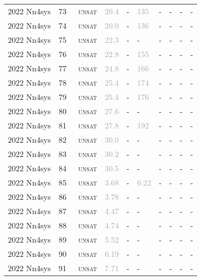 \begin{center}
{\begin{longtable}{@{}llllllllll@{}}
2022 Nn4sys & 73 & ~\textsc{unsat} & \textcolor{darkgray}{20.4} & - & \textcolor{darkgray}{135} & - & - & - & - \\
2022 Nn4sys & 74 & ~\textsc{unsat} & \textcolor{darkgray}{20.0} & - & \textcolor{darkgray}{136} & - & - & - & - \\
2022 Nn4sys & 75 & ~\textsc{unsat} & \textcolor{darkgray}{22.3} & - & - & - & - & - & - \\
2022 Nn4sys & 76 & ~\textsc{unsat} & \textcolor{darkgray}{22.8} & - & \textcolor{darkgray}{155} & - & - & - & - \\
2022 Nn4sys & 77 & ~\textsc{unsat} & \textcolor{darkgray}{24.8} & - & \textcolor{darkgray}{166} & - & - & - & - \\
2022 Nn4sys & 78 & ~\textsc{unsat} & \textcolor{darkgray}{25.4} & - & \textcolor{darkgray}{174} & - & - & - & - \\
2022 Nn4sys & 79 & ~\textsc{unsat} & \textcolor{darkgray}{25.4} & - & \textcolor{darkgray}{176} & - & - & - & - \\
2022 Nn4sys & 80 & ~\textsc{unsat} & \textcolor{darkgray}{27.6} & - & - & - & - & - & - \\
2022 Nn4sys & 81 & ~\textsc{unsat} & \textcolor{darkgray}{27.8} & - & \textcolor{darkgray}{192} & - & - & - & - \\
2022 Nn4sys & 82 & ~\textsc{unsat} & \textcolor{darkgray}{30.0} & - & - & - & - & - & - \\
2022 Nn4sys & 83 & ~\textsc{unsat} & \textcolor{darkgray}{30.2} & - & - & - & - & - & - \\
2022 Nn4sys & 84 & ~\textsc{unsat} & \textcolor{darkgray}{30.5} & - & - & - & - & - & - \\
2022 Nn4sys & 85 & ~\textsc{unsat} & \textcolor{darkgray}{3.68} & - & \textcolor{darkgray}{6.22} & - & - & - & - \\
2022 Nn4sys & 86 & ~\textsc{unsat} & \textcolor{darkgray}{3.78} & - & - & - & - & - & - \\
2022 Nn4sys & 87 & ~\textsc{unsat} & \textcolor{darkgray}{4.47} & - & - & - & - & - & - \\
2022 Nn4sys & 88 & ~\textsc{unsat} & \textcolor{darkgray}{4.74} & - & - & - & - & - & - \\
2022 Nn4sys & 89 & ~\textsc{unsat} & \textcolor{darkgray}{5.52} & - & - & - & - & - & - \\
2022 Nn4sys & 90 & ~\textsc{unsat} & \textcolor{darkgray}{6.19} & - & - & - & - & - & - \\
2022 Nn4sys & 91 & ~\textsc{unsat} & \textcolor{darkgray}{7.71} & - & - & - & - & - & - \\

\end{longtable}}
\end{center}

